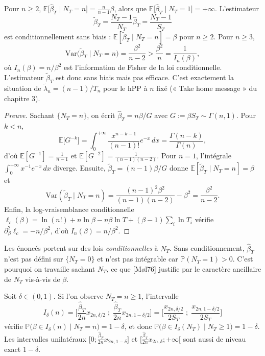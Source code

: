 \begin{corollaire}\label{cor:biais}
Pour $n\ge2$, $\mathbb{E}\big[\hat\beta_T\mid N_T=n\big]=\frac{n}{n-1}\beta$, alors que $\mathbb{E}\big[\hat\beta_T\mid N_T=1\big]=+\infty$. L'estimateur
\[
\tilde\beta_T=\frac{N_T-1}{N_T}\hat\beta_T=\frac{N_T-1}{S_T}
\]
est conditionnellement sans biais : $\mathbb{E}[\tilde\beta_T\mid N_T=n]=\beta$ pour $n\ge2$. Pour $n\ge3$,
\[
\mathrm{Var}\big(\tilde\beta_T\mid N_T=n\big)=\frac{\beta^2}{n-2}>\frac{\beta^2}{n}=\frac{1}{I_n(\beta)},
\]
où $I_n(\beta)=n/\beta^2$ est l'information de Fisher de la loi conditionnelle. L'estimateur $\tilde\beta_T$ est donc sans biais mais pas efficace. C'est exactement la situation de $\tilde\lambda_n=(n-1)/T_n$ pour le hPP à $n$ fixé (« Take home message » du chapitre 3).
\end{corollaire}

\begin{proof}[Preuve]
Sachant $\{N_T=n\}$, on écrit $\hat\beta_T=n\beta/G$ avec $G:=\beta S_T\sim\Gamma(n,1)$. Pour $k<n$,
\[
\mathbb{E}\big[G^{-k}\big]=\int_0^{+\infty}\frac{x^{n-k-1}}{(n-1)!}e^{-x}\,dx=\frac{\Gamma(n-k)}{\Gamma(n)} ,
\]
d'où $\mathbb{E}[G^{-1}]=\frac{1}{n-1}$ et $\mathbb{E}[G^{-2}]=\frac{1}{(n-1)(n-2)}$. Pour $n=1$, l'intégrale $\int_0^{+\infty}x^{-1}e^{-x}\,dx$ diverge. Ensuite, $\tilde\beta_T=(n-1)\beta/G$ donne $\mathbb{E}[\tilde\beta_T\mid N_T=n]=\beta$ et
\[
\mathrm{Var}(\tilde\beta_T\mid N_T=n)=\frac{(n-1)^2\beta^2}{(n-1)(n-2)}-\beta^2=\frac{\beta^2}{n-2}.
\]
Enfin, la log-vraisemblance conditionnelle $\ell_c(\beta)=\ln(n!)+n\ln\beta-n\beta\ln T+(\beta-1)\sum_i\ln T_i$ vérifie $\partial^2_\beta\ell_c=-n/\beta^2$, d'où $I_n(\beta)=n/\beta^2$.
\end{proof}

\begin{remarque}
Les énoncés portent sur des lois \emph{conditionnelles} à $N_T$. Sans conditionnement, $\hat\beta_T$ n'est pas défini sur $\{N_T=0\}$ et n'est pas intégrable car $\mathbb{P}(N_T=1)>0$. C'est pourquoi on travaille sachant $N_T$, ce que [Møl76] justifie par le caractère ancillaire de $N_T$ vis-à-vis de $\beta$.
\end{remarque}

\begin{corollaire}\label{cor:icexact}
Soit $\delta\in(0,1)$. Si l'on observe $N_T=n\ge1$, l'intervalle
\[
I_\delta(n)=\Big[\frac{\hat\beta_T}{2n}x_{2n,\delta/2}\;;\;\frac{\hat\beta_T}{2n}x_{2n,1-\delta/2}\Big]
=\Big[\frac{x_{2n,\delta/2}}{2S_T}\;;\;\frac{x_{2n,1-\delta/2}}{2S_T}\Big]
\]
vérifie $\mathbb{P}\big(\beta\in I_\delta(n)\mid N_T=n\big)=1-\delta$, et donc $\mathbb{P}\big(\beta\in I_\delta(N_T)\mid N_T\ge1\big)=1-\delta$. Les intervalles unilatéraux $\big[0;\frac{\hat\beta_T}{2n}x_{2n,1-\delta}\big]$ et $\big[\frac{\hat\beta_T}{2n}x_{2n,\delta};+\infty\big[$ sont aussi de niveau exact $1-\delta$.
\end{corollaire}

